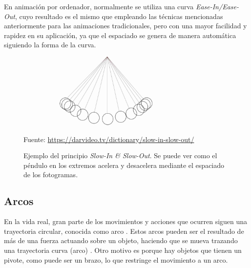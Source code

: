 \documentclass{article}
\begin{document}
\bigskip

En animación por ordenador, normalmente se utiliza una curva \textit{Ease-In/Ease-Out}, cuyo resultado es el mismo que empleando las técnicas mencionadas anteriormente para las animaciones tradicionales, pero con una mayor facilidad y rapidez en su aplicación, ya que el espaciado se genera de manera automática siguiendo la forma de la curva.

\begin{figure}[H]
    \centering
    \includegraphics[width=0.8\textwidth]{imagenes/Slow-In-and-Slow-Out.jpg}
    \caption{Ejemplo del principio \textit{Slow-In \& Slow-Out}. Se puede ver como el péndulo en los extremos acelera y desacelera mediante el espaciado de los fotogramas.}
    \vspace{10pt}
    \footnotesize{Fuente: \url{https://darvideo.tv/dictionary/slow-in-slow-out/}}
\end{figure}

\subsection{Arcos}


En la vida real, gran parte de los movimientos y acciones que ocurren siguen una trayectoria circular, conocida como arco \cite{arcsdsource}. Estos arcos pueden ser el resultado de más de una fuerza actuando sobre un objeto, haciendo que se mueva trazando una trayectoria curva (arco) \cite{arcslinkedin}. Otro motivo es porque hay objetos que tienen un pivote, como puede ser un brazo, lo que restringe el movimiento a un arco.
\end{document}
